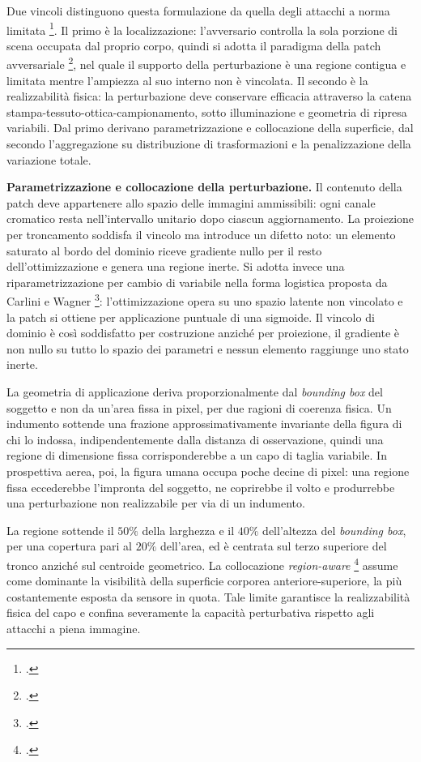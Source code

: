 \documentclass[a4paper,12pt]{report}
\begin{document}
Due vincoli distinguono questa formulazione da quella degli attacchi a norma
limitata \footcite{carlini_2017}. Il primo è la localizzazione: l'avversario
controlla la sola porzione di scena occupata dal proprio corpo, quindi si adotta
il paradigma della patch avversariale \footcite{brown_2017_patch}, nel quale il
supporto della perturbazione è una regione contigua e limitata mentre l'ampiezza
al suo interno non è vincolata. Il secondo è la realizzabilità fisica: la
perturbazione deve conservare efficacia attraverso la catena
stampa-tessuto-ottica-campionamento, sotto illuminazione e geometria di ripresa
variabili. Dal primo derivano parametrizzazione e collocazione della superficie,
dal secondo l'aggregazione su distribuzione di trasformazioni e la
penalizzazione della variazione totale.

\textbf{Parametrizzazione e collocazione della perturbazione.}
\label{sec:sigmoide}
\label{sec:collocazione}
Il contenuto della patch deve appartenere allo spazio delle immagini
ammissibili: ogni canale cromatico resta nell'intervallo unitario dopo ciascun
aggiornamento. La proiezione per troncamento soddisfa il vincolo ma introduce un
difetto noto: un elemento saturato al bordo del dominio riceve gradiente nullo
per il resto dell'ottimizzazione e genera una regione inerte. Si adotta invece
una riparametrizzazione per cambio di variabile nella forma logistica proposta
da Carlini e Wagner \footcite{carlini_2017}: l'ottimizzazione opera su uno spazio
latente non vincolato e la patch si ottiene per applicazione puntuale di una
sigmoide. Il vincolo di dominio è così soddisfatto per costruzione anziché per
proiezione, il gradiente è non nullo su tutto lo spazio dei parametri e nessun
elemento raggiunge uno stato inerte.

La geometria di applicazione deriva proporzionalmente dal \textit{bounding box}
del soggetto e non da un'area fissa in pixel, per due ragioni di coerenza
fisica. Un indumento sottende una frazione approssimativamente invariante della
figura di chi lo indossa, indipendentemente dalla distanza di osservazione,
quindi una regione di dimensione fissa corrisponderebbe a un capo di taglia
variabile. In prospettiva aerea, poi, la figura umana occupa poche decine di
pixel: una regione fissa eccederebbe l'impronta del soggetto, ne coprirebbe il
volto e produrrebbe una perturbazione non realizzabile per via di un indumento.

La regione sottende il $50\%$ della larghezza e il $40\%$ dell'altezza del
\textit{bounding box}, per una copertura pari al $20\%$ dell'area, ed è centrata
sul terzo superiore del tronco anziché sul centroide geometrico. La collocazione
\textit{region-aware} \footcite{huang_2020_upc} assume come dominante la
visibilità della superficie corporea anteriore-superiore, la più costantemente
esposta da sensore in quota. Tale limite garantisce la realizzabilità fisica del
capo e confina severamente la capacità perturbativa rispetto agli attacchi a
piena immagine.
\end{document}
